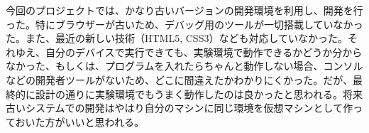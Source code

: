 今回のプロジェクトでは、かなり古いバージョンの開発環境を利用し、開発を行った。特にブラウザーが古いため、デバッグ用のツールが一切搭載していなかった。また、最近の新しい技術（HTML5, CSS3）なども対応していなかった。それゆえ、自分のデバイスで実行できても、実験環境で動作できるかどうか分からなかった、もしくは、プログラムを入れたらちゃんと動作しない場合、コンソルなどの開発者ツールがないため、どこに間違えたかわかりにくかった。だが、最終的に設計の通りに実験環境でもうまく動作したのは良かったと思われる。将来古いシステムでの開発はやはり自分のマシンに同じ環境を仮想マシンとして作っておいた方がいいと思われる。